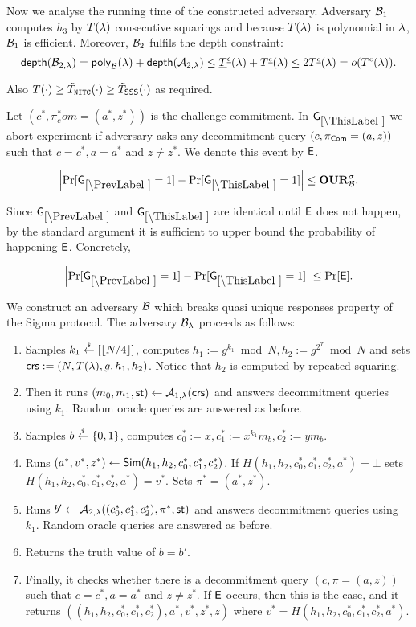 Now we analyse the running time of the constructed adversary. Adversary $\mathcal{B}_1$ computes $h_3$ by $T(\lambda)$ consecutive squarings and because $T(\lambda)$ is polynomial in $\lambda$, $\mathcal{B}_1$ is efficient. Moreover, $\mathcal{B}_2$ fulfils the depth constraint:
\[ \mathsf{depth}(\mathcal{B}_{2,\lambda}) = \mathsf{poly}_{\mathcal{B}}(\lambda) + \mathsf{depth}(\mathcal{A}_{2,\lambda}) \leq \underline{T}^{\underline{\epsilon}}(\lambda) + T^{\underline{\epsilon}}(\lambda) \leq 2 T^{\underline{\epsilon}}(\lambda) = o(T^{\epsilon}(\lambda)). \] 

Also $T(\cdot) \geq \tilde{T}_{\mathtt{NITC}}(\cdot) \geq \tilde{T}_\mathsf{SSS}(\cdot)$ as required.  


Let $(c^*, \pi^*_com=(a^*,z^*))$ is the challenge commitment. In $\games_\thisgame$ we abort experiment if adversary asks any decommitment query $(c,\pi_{\mathsf{Com}}=(a,z))$ such that $c=c^*, a = a^*$ and $z \neq z^*$. We denote this event by $\mathsf{E}$.
\begin{lemma}
\[
\left|\Pr[\games_\prevgame = 1] - \Pr[\games_\thisgame = 1]\right| \leq \qur^\sigma_\advB.
\]
\end{lemma}


Since $\games_\prevgame$ and $\games_\thisgame$ are identical until $\mathsf{E}$ does not happen, by the standard argument it is sufficient to upper bound the probability of happening $\mathsf{E}$. Concretely,  

\[
\left|\Pr[\games_\prevgame = 1] - \Pr[\games_\thisgame = 1]\right| \leq \Pr[\event]. 
\]

We construct an adversary $\mathcal{B}$ which breaks quasi unique responses property of the Sigma protocol. 
The adversary $\mathcal{B}_{\lambda}$ proceeds as follows:
\vspace{-2mm}
\begin{enumerate}
\item Samples $k_1\stackrel{{\scriptscriptstyle\$}}{\leftarrow} [\left\lfloor N/4 \right\rfloor]$, computes $h_1 := g^{k_1} \bmod N, h_2:=g^{2^T} \bmod N$ and sets $\mathsf{crs}:=(N, T(\lambda), g, h_1, h_2)$. Notice that $h_2$ is computed by repeated squaring. 
\item Then it runs $(m_0, m_1, \mathsf{st}) \leftarrow \mathcal{A}_{1, \lambda}(\mathsf{crs})$ and answers decommitment queries using $k_1$. Random oracle queries are answered as before. 
\item Samples $b \stackrel{{\scriptscriptstyle\$}}{\leftarrow} \{0,1\}$, computes $c_0^*:=x, c_1^*:=x^{k_1} m_b, c_2^*:=y m_b$.
\item Runs $(a^*,v^*,z^*) \leftarrow \mathsf{Sim}(h_1, h_2, c_0^*, c_1^*, c_2^*)$. If $H(h_1, h_2, c_0^*, c_1^*, c_2^*,a^*) = \bot$ sets $H(h_1, h_2, c_0^*, c_1^*, c_2^*,a^*) = v^*$. Sets $\pi^* = (a^*,z^*)$.
\item Runs $b' \leftarrow \mathcal{A}_{2, \lambda}((c_0^*, c_1^*, c_2^*), \pi^*, \mathsf{st})$ and answers decommitment queries using $k_1$. Random oracle queries are answered as before. 
\item Returns the truth value of $b=b'$.
\item Finally, it checks whether there is a decommitment query $(c,\pi=(a,z))$ such that $c= c^*, a = a^*$ and $z \neq z^*$. If $\mathsf{E}$ occurs, then this is the case, and it returns $((h_1, h_2, c_0^*, c_1^*, c_2^*),a^*,v^*,z^*,z)$ where $v^* = H(h_1, h_2, c_0^*, c_1^*, c_2^*,a^*)$.
\end{enumerate}

